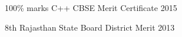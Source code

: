 



\begin{cvhonors}

  \cvhonor
	{100\% marks} %
	{C++ CBSE Merit Certificate} %
	{} %
	{2015} %

  \cvhonor
    {8th} %
    {Rajasthan State Board District Merit} %
    {} %
    {2013} %

\end{cvhonors}
